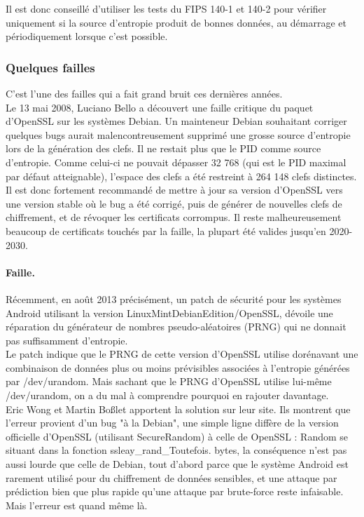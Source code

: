 		
		Il est donc conseillé d'utiliser les tests du FIPS 140-1 et 140-2 pour vérifier uniquement si la source d'entropie produit de bonnes données, au démarrage et périodiquement lorsque c'est possible.
		
		\subsubsection{Quelques failles}
C'est l'une des failles qui a fait grand bruit ces dernières années.\\
Le 13 mai 2008, Luciano Bello a découvert une faille critique du paquet d’OpenSSL sur les systèmes Debian. Un mainteneur Debian souhaitant corriger quelques bugs aurait malencontreusement supprimé une grosse source d’entropie lors de la génération des clefs. Il ne restait plus que le PID comme source d’entropie. Comme celui-ci ne pouvait dépasser 32 768 (qui est le PID maximal par défaut atteignable), l’espace des clefs a été restreint à 264 148 clefs distinctes.\\

Il est donc fortement recommandé de mettre à jour sa version d'OpenSSL vers une version stable où le bug a été corrigé, puis de générer de nouvelles clefs de chiffrement, et de révoquer les certificats corrompus. Il reste malheureusement beaucoup de certificats touchés par la faille, la plupart été valides jusqu'en 2020-2030.

\paragraph{Faille.\\}
Récemment, en août 2013 précisément, un patch de sécurité pour les systèmes Android utilisant la version LinuxMintDebianEdition/OpenSSL, dévoile une réparation du générateur de nombres pseudo-aléatoires (PRNG) qui ne donnait pas suffisamment d’entropie.\\


Le patch indique que le PRNG de cette version d’OpenSSL utilise dorénavant une combinaison de données plus ou moins prévisibles associées à l’entropie générées par /dev/urandom. Mais sachant que le PRNG d’OpenSSL utilise lui-même /dev/urandom, on a du mal à comprendre pourquoi en rajouter davantage.\\


Eric Wong et Martin Boßlet apportent la solution sur leur site. Ils montrent que l’erreur provient d’un bug "à la Debian", une simple ligne diffère de la version officielle d’OpenSSL (utilisant SecureRandom) à celle de OpenSSL : Random se situant dans la fonction ssleay\_rand\_Toutefois. bytes, la conséquence n’est pas aussi lourde que celle de Debian, tout d’abord parce que le système Android est rarement utilisé
pour du chiffrement de données sensibles, et une attaque par prédiction bien que plus rapide qu’une attaque par brute-force reste infaisable. Mais l’erreur est quand même là.\\

